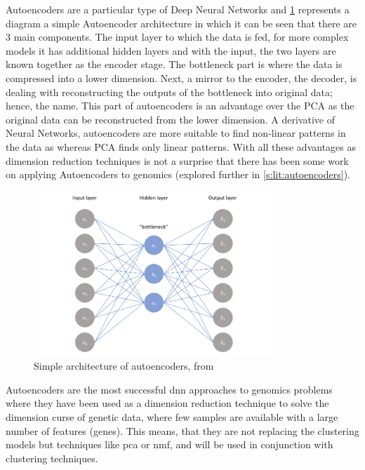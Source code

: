 Autoencoders are a particular type of Deep Neural Networks and \cref{fig:autoencoders} represents a diagram a simple Autoencoder architecture in which it can be seen that there are 3 main components. The input layer to which the data is fed, for more complex models it has additional hidden layers and with the input, the two layers are known together as the encoder stage. The bottleneck part is where the data is compressed into a lower dimension. Next, a mirror to the encoder, the decoder, is dealing with reconstructing the outputs of the bottleneck into original data; hence, the name. This part of autoencoders is an advantage over the PCA as the original data can be reconstructed from the lower dimension. A derivative of Neural Networks, autoencoders are more suitable to find non-linear patterns in the data as whereas PCA finds only linear patterns. With all these advantages as dimension reduction techniques is not a surprise that there has been some work on applying Autoencoders to genomics (explored further in \cref{s:lit:autoencoders}).

\begin{figure}[!htb]
  \centering\includegraphics[width=0.8\textwidth,height=0.5\textheight,keepaspectratio]{Images/Autoencoders/simple_autoencoders.png}
    \caption{Simple architecture of autoencoders, from \cite{Jordan2018-bc}}
    \label{fig:autoencoders}
\end{figure}
\FloatBarrier

Autoencoders are the most successful \acrshort{dnn} approaches to genomics problems where they have been used as a dimension reduction technique to solve the dimension curse of genetic data, where few samples are available with a large number of features (genes). This means, that they are not replacing the clustering models but techniques like \acrfull{pca} or \acrfull{nmf}, and will be used in conjunction with clustering techniques.


